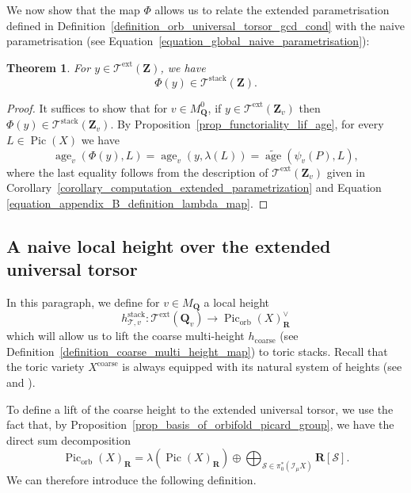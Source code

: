 \documentclass{proc-l}
\newcommand{\R}{\mathbf{R}}
\newcommand{\Z}{\mathbf{Z}}
\newcommand{\Q}{\mathbf{Q}}
\DeclareMathOperator{\Pic}{Pic}
\DeclareMathOperator{\stack}{stack}
\DeclareMathOperator{\age}{age}
\DeclareMathOperator{\coarse}{coarse}
\DeclareMathOperator{\orb}{orb}
\DeclareMathOperator{\ext}{ext}
\newcommand{\stackS}{\mathcal{S}}
\newcommand{\stackT}{\mathcal{T}}
\newcommand{\sheafI}{\mathcal{I}}
\newcommand{\twistsector}{\pi_0^*(\sheafI_{\mu} X)}
\newtheorem{theorem}{Theorem}[section]
\theoremstyle{definition}
\theoremstyle{remark}
\numberwithin{equation}{section}
\begin{document}
We now show that the map $\Phi$ allows us to relate the extended parametrisation defined in Definition~\ref{definition_orb_universal_torsor_gcd_cond} with the naive parametrisation (see Equation~\eqref{equation_global_naive_parametrisation}):

\begin{theorem}\label{theorem_lien_extended_parametrisation_naive_parametrisation}
For $y \in \stackT^{\ext}(\Z)$, we have
$$
\Phi(y) \in \stackT^{\stack}(\Z).
$$
\end{theorem}

\begin{proof}
It suffices to show that for $v \in M_{\Q}^0$, if $y \in \stackT^{\ext}(\Z_v)$ then $\Phi(y) \in \stackT^{\stack}(\Z_v)$. By Proposition~\ref{prop_functoriality_lif_age}, for every $L \in \Pic(X)$ we have
$$
\age_v(\Phi(y),L)
=
\age_v(y,\lambda(L))
=
\widetilde{\age}(\psi_v(P),L),
$$
where the last equality follows from the description of $\stackT^{\ext}(\Z_v)$ given in Corollary~\ref{corollary_computation_extended_parametrization} and Equation \eqref{equation_appendix_B_definition_lambda_map}.
\end{proof}



\subsection{A naive local height over the extended universal torsor}




In this paragraph, we define for $v \in M_{\Q}$ a local height
\[
    h_{\stackT,v}^{\stack} : \stackT^{\ext}(\Q_v) \longrightarrow \Pic_{\orb}(X)^{\vee}_{\R}
\]
which will allow us to lift the coarse multi-height $h_{\coarse}$ (see Definition~\ref{definition_coarse_multi_height_map}) to toric stacks. Recall that the toric variety $X^{\coarse}$ is always equipped with its natural system of heights (see \cite[Definition~9.2]{salberger_torsor} and \cite[Proposition~2.1.2]{Batyrev1990}).

To define a lift of the coarse height to the extended universal torsor, we use the fact that, by Proposition~\ref{prop_basis_of_orbifold_picard_group}, we have the direct sum decomposition 
$$
\Pic_{\orb}(X)_{\R}
=
\lambda\left(\Pic(X)_{\R}\right)
\oplus
\bigoplus_{\stackS \in \twistsector} \R [\stackS].
$$
We can therefore introduce the following definition.
\end{document}
